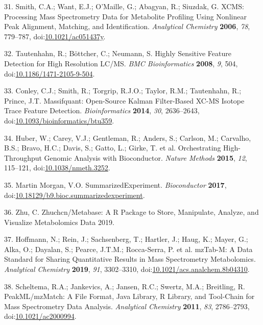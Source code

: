 \documentclass[]{article}
\begin{document}
\leavevmode\hypertarget{ref-smith_2006}{}%
31. Smith, C.A.; Want, E.J.; O'Maille, G.; Abagyan, R.; Siuzdak, G. XCMS: Processing Mass Spectrometry Data for Metabolite Profiling Using Nonlinear Peak Alignment, Matching, and Identification. \emph{Analytical Chemistry} \textbf{2006}, \emph{78}, 779--787, doi:\href{https://doi.org/10.1021/ac051437y}{10.1021/ac051437y}.

\leavevmode\hypertarget{ref-tautenhahn_2008}{}%
32. Tautenhahn, R.; Böttcher, C.; Neumann, S. Highly Sensitive Feature Detection for High Resolution LC/MS. \emph{BMC Bioinformatics} \textbf{2008}, \emph{9}, 504, doi:\href{https://doi.org/10.1186/1471-2105-9-504}{10.1186/1471-2105-9-504}.

\leavevmode\hypertarget{ref-conley_2014}{}%
33. Conley, C.J.; Smith, R.; Torgrip, R.J.O.; Taylor, R.M.; Tautenhahn, R.; Prince, J.T. Massifquant: Open-Source Kalman Filter-Based XC-MS Isotope Trace Feature Detection. \emph{Bioinformatics} \textbf{2014}, \emph{30}, 2636--2643, doi:\href{https://doi.org/10.1093/bioinformatics/btu359}{10.1093/bioinformatics/btu359}.

\leavevmode\hypertarget{ref-huber_2015}{}%
34. Huber, W.; Carey, V.J.; Gentleman, R.; Anders, S.; Carlson, M.; Carvalho, B.S.; Bravo, H.C.; Davis, S.; Gatto, L.; Girke, T. et al. Orchestrating High-Throughput Genomic Analysis with Bioconductor. \emph{Nature Methods} \textbf{2015}, \emph{12}, 115--121, doi:\href{https://doi.org/10.1038/nmeth.3252}{10.1038/nmeth.3252}.

\leavevmode\hypertarget{ref-martinmorgan_2017}{}%
35. Martin Morgan, V.O. SummarizedExperiment. \emph{Bioconductor} \textbf{2017}, doi:\href{https://doi.org/10.18129/b9.bioc.summarizedexperiment}{10.18129/b9.bioc.summarizedexperiment}.

\leavevmode\hypertarget{ref-zhu_website_2019}{}%
36. Zhu, C. Zhuchcn/Metabase: A R Package to Store, Manipulate, Analyze, and Visualize Metabolomics Data 2019.

\leavevmode\hypertarget{ref-hoffmann_2019}{}%
37. Hoffmann, N.; Rein, J.; Sachsenberg, T.; Hartler, J.; Haug, K.; Mayer, G.; Alka, O.; Dayalan, S.; Pearce, J.T.M.; Rocca-Serra, P. et al. mzTab-M: A Data Standard for Sharing Quantitative Results in Mass Spectrometry Metabolomics. \emph{Analytical Chemistry} \textbf{2019}, \emph{91}, 3302--3310, doi:\href{https://doi.org/10.1021/acs.analchem.8b04310}{10.1021/acs.analchem.8b04310}.

\leavevmode\hypertarget{ref-scheltema_2011}{}%
38. Scheltema, R.A.; Jankevics, A.; Jansen, R.C.; Swertz, M.A.; Breitling, R. PeakML/mzMatch: A File Format, Java Library, R Library, and Tool-Chain for Mass Spectrometry Data Analysis. \emph{Analytical Chemistry} \textbf{2011}, \emph{83}, 2786--2793, doi:\href{https://doi.org/10.1021/ac2000994}{10.1021/ac2000994}.
\end{document}

